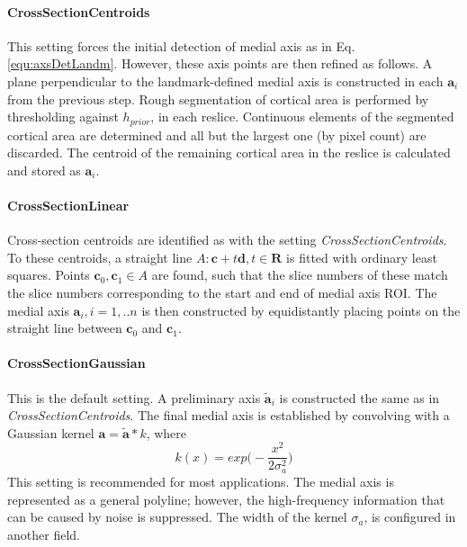 \documentclass[11pt,twoside,a4paper,titlepage]{report}
\begin{document}
\paragraph{CrossSectionCentroids}
This setting forces the initial detection of medial axis as in Eq.\ref{equ:axsDetLandm}.
However, these axis points are then refined as follows.
A plane perpendicular to the landmark-defined medial axis is constructed in each \(\mathbf{a}_i\) from the previous step.
Rough segmentation of cortical area is performed by thresholding against \(h_{prior}\), in each reslice.
Continuous elements of the segmented cortical area are determined and all but the largest one (by pixel count) are discarded.
The centroid of the remaining cortical area in the reslice is calculated and stored as \(\mathbf{a}_i\).

\paragraph{CrossSectionLinear}
Cross-section centroids are identified as with the setting \emph{CrossSectionCentroids}.
To these centroids, a straight line \(A: \mathbf{c} + t\mathbf{d}, t\in\mathbf{R}\) is fitted with ordinary least squares.
Points \(\mathbf{c}_0, \mathbf{c}_1 \in A\) are found, such that the slice numbers of these match the slice numbers corresponding to the start and end of medial axis ROI.
The medial axis \(\mathbf{a}_i, i=1,..n\) is then constructed by equidistantly placing points on the straight line between \(\mathbf{c}_0\) and \(\mathbf{c}_1\).

\paragraph{CrossSectionGaussian}
This is the default setting.
A preliminary axis \(\tilde{\mathbf{a}}_i\) is constructed the same as in \emph{CrossSectionCentroids}.
The final medial axis is established by convolving with a Gaussian kernel \(\mathbf{a} = \tilde{\mathbf{a}} \ast k\), where
\begin{equation}
k(x) = exp\bigg(-\frac{x^2}{2\sigma_a^2}\bigg)
\label{equ:axsDetGauss}
\end{equation}
This setting is recommended for most applications.
The medial axis is represented as a general polyline; however, the high-frequency information that can be caused by noise is suppressed.
The width of the kernel \(\sigma_a\), is configured in another field.
\end{document}
